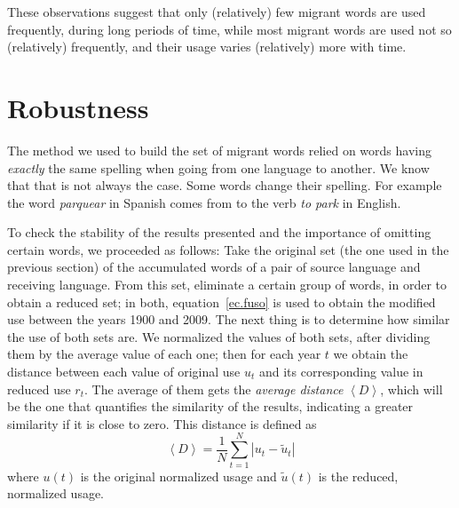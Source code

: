 \documentclass[10pt,letterpaper]{article} %
\begin{document}
These observations suggest that only (relatively) few migrant words are used frequently, during long periods of time, while most migrant words are used not so (relatively) frequently, and their usage varies (relatively) more with time. 



\section*{Robustness} %
The method we used to build the set of migrant words relied on words having {\it
exactly} the same spelling when going from one language to another. We know 
that that is not always the case. Some words change their spelling. For example
the word {\it parquear} in Spanish comes from to the verb {\it to park} in
English. 


To check the stability of the results presented and the importance of omitting
certain words, we proceeded as follows:  Take the original set (the one
used in the previous section) of the accumulated words of a pair of source
language and receiving language. From this set, eliminate a certain group
of words, in order to obtain a reduced set; in both,  equation~\ref{ec.fuso} is
used to obtain the modified use between the years 1900 and 2009.  The next
thing is to determine how similar the use of both sets are. We normalized the
values of both sets, after dividing them by the average value of each one; then
for each year $t$ we obtain the distance between each value of original use
$u_{t}$ and its corresponding value in reduced use $r_{t}$. The average of them
gets the \textit{average distance} $\left\langle D \right\rangle$, which will
be the one that quantifies the similarity of the results, indicating a greater
similarity if it is close to zero. This distance is defined as 
\begin{equation}
\left\langle D \right\rangle  = \frac{1}{N}\sum_{t=1}^{N} \left| u_{t} - \tilde u_{t} \right|  
\label{ec.Davg}
\end{equation}
where $u(t)$ is the original normalized usage and $\tilde u(t)$ is the reduced,
normalized usage.
\end{document}
